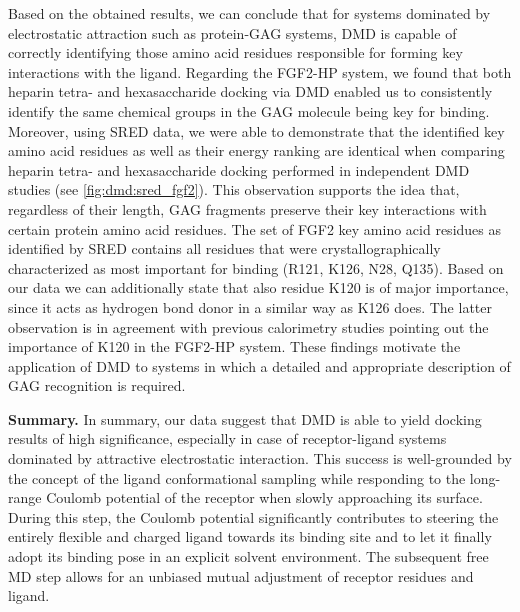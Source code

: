 Based on the obtained results, we can conclude that for systems dominated by
electrostatic attraction such as protein-GAG systems, DMD is capable of
correctly identifying those amino acid residues responsible for forming key
interactions with the ligand. Regarding the FGF2-HP system, we found that both
heparin tetra- and hexasaccharide docking via DMD enabled us to consistently
identify the same chemical groups in the GAG molecule being key for binding.
Moreover, using SRED data, we were able to demonstrate that the identified key
amino acid residues as well as their energy ranking are identical when comparing
heparin tetra- and hexasaccharide docking performed in independent DMD studies
(see \cref{fig:dmd:sred_fgf2}). This observation supports the idea that,
regardless of their length, GAG fragments preserve their key interactions with
certain protein amino acid residues. The set of FGF2 key amino acid residues as
identified by SRED contains all residues that were crystallographically
characterized as most important for binding (R121, K126, N28,
Q135){\cite{faham_heparin_1996}}. Based on our data we can additionally state
that also residue K120 is of major importance, since it acts as hydrogen bond
donor in a similar way as K126 does. The latter observation is in agreement with
previous calorimetry studies pointing out the importance of K120 in the FGF2-HP
system{\cite{thompson_1994_fgf2_heparin}}. These findings motivate the
application of DMD to systems in which a detailed and appropriate description of
GAG recognition is required.

\vspace{1cm}
\textbf{Summary.}
In summary, our data suggest that DMD is able to yield docking
results of high significance, especially in case of receptor-ligand systems
dominated by attractive electrostatic interaction. This success is well-grounded
by the concept of the ligand conformational sampling while responding to the
long-range Coulomb potential of the receptor when slowly approaching its
surface. During this step, the Coulomb potential significantly contributes to
steering the entirely flexible and charged ligand towards its binding site and
to let it finally adopt its binding pose in an explicit solvent environment. The
subsequent free MD step allows for an unbiased mutual adjustment of receptor
residues and ligand.

